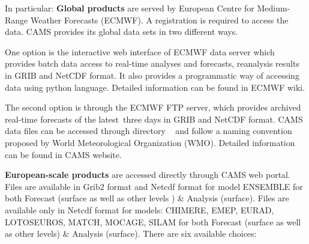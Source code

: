 \documentclass[9pt]{report}
\begin{document}
\noindent{}In particular:
\mdbr
{}\mdbr
{}\textbf{Global products} are served by European Centre for Medium-Range Weather Forecasts (ECMWF).
A registration is required to access the data.
CAMS provides its global data sets in two different ways.%

One option is the interactive web interface of ECMWF data server which provides batch data access to real-time analyses and forecasts, reanalysis results in GRIB and NetCDF format.
It also provides a programmatic way of accessing data using python language. Detailed information can be found in ECMWF wiki.%

The second option is through the ECMWF FTP server, which provides archived real-time forecasts of the latest three days in GRIB and NetCDF format.
CAMS data files can be accessed through directory ~ and follow a naming convention proposed by World Meteorological Organization (WMO).
Detailed information can be found in CAMS website.%

\mdbr
{}\textbf{European-scale products} are accessed directly through CAMS web portal. Files are available in Grib2 format and Netcdf format for model ENSEMBLE for both Forecast (surface as well as other levels ) \& Analysis (surface).
Files are available only in Netcdf format for models: CHIMERE, EMEP, EURAD, LOTOSEUROS, MATCH, MOCAGE, SILAM for both Forecast (surface as well as other levels) \& Analysis (surface).
There are six available choices:%
\end{document}
